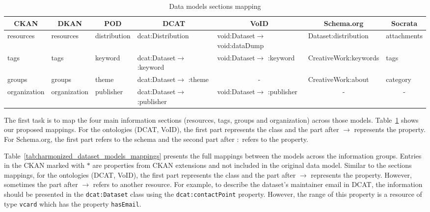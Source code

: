 \documentclass[runningheads,a4paper]{../../Tools/LaTEX/llncs}
\begin{document}
\begin{table}[!htbp]
\centering
\tiny
\begin{tabular}{|l|l|l|l|l|l|l|}
\hline
\multicolumn{1}{|c|}{\textbf{CKAN}} & \multicolumn{1}{c|}{\textbf{DKAN}} & \multicolumn{1}{c|}{\textbf{POD}} & \multicolumn{1}{c|}{\textbf{DCAT}}     & \multicolumn{1}{c|}{\textbf{VoID}}     & \multicolumn{1}{c|}{\textbf{Schema.org}} & \multicolumn{1}{c|}{\textbf{Socrata}} \\ \hline
resources                           & resources                          & distribution                      & dcat:Distribution                      & void:Dataset$\rightarrow$ void:dataDump & Dataset:distribution                    & attachments                           \\ \hline
tags                                & tags                               & keyword                           & dcat:Dataset$\rightarrow$ :keyword   & void:Dataset$\rightarrow$ :keyword   & CreativeWork:keywords                     & tags                                  \\ \hline
groups                              & groups                             & theme                             & dcat:Dataset$\rightarrow$ :theme     &   \multicolumn{1}{c|}{-}                                      & CreativeWork:about                       & category                              \\ \hline
organization                        & organization                       & publisher                         & dcat:Dataset$\rightarrow$ :publisher &   void:Dataset$\rightarrow$ :publisher                                     & \multicolumn{1}{c|}{-}                   & \multicolumn{1}{c|}{-}                                      \\ \hline
\end{tabular}
\caption{Data models sections mapping}
\label{tab:models_section_mappings}
\end{table}

The first task is to map the four main information sections (resources, tags, groups and organization) across those models. Table~\ref{tab:models_section_mappings} shows our proposed mappings. For the ontologies (DCAT, VoID), the first part represents the class and the part after $\rightarrow$ represents the property. For Schema.org, the first part refers to the schema and the second part after $:$ refers to the property.

Table~\ref{tab:harmonized_dataset_models_mappings} presents the full mappings between the models across the information groups. Entries in the CKAN marked with $\ast$ are properties from CKAN extensions and not included in the original data model. Similar to the sections mappings, for the ontologies (DCAT, VoID), the first part represents the class and the part after $\rightarrow$ represents the property. However, sometimes the part after $\rightarrow$ refers to another resource. For example, to describe the dataset's maintainer email in DCAT, the information should be presented in the \texttt{dcat:Dataset} class using the \texttt{dcat:contactPoint} property. However, the range of this property is a resource of type \texttt{vcard} which has the property \texttt{hasEmail}.
\end{document}

